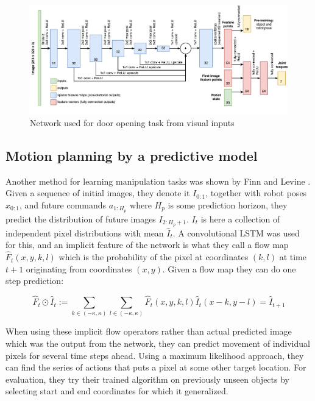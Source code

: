 \begin{figure}[h]
    \centering
    \includegraphics[width = 1.0\textwidth]{res/gps-net.pdf}
    \caption{Network used for door opening task from visual inputs \cite{chebotar2016path}}
    \label{fig:gps_net}
\end{figure}

\subsection{Motion planning by a predictive model}

Another method for learning manipulation tasks was shown by Finn and Levine
\cite{finn2016deep}. Given a sequence of initial images, they denote it
$I_{0:1}$, together with robot poses $x_{0:1}$, and future commands $a_{1:H_p}$
where $H_p$ is some prediction horizon, they predict the distribution of future
images $I_{2:H_p + 1}$. $I_t$ is here a collection of independent pixel
distributions with mean $\hat{I}_t$. A convolutional LSTM was used for this,
and an implicit feature of the network is what they call a flow map
$\hat{F}_t(x, y, k, l)$ which is the probability of the pixel at coordinates
$(k, l)$ at time $t+1$ originating from coordinates $(x, y)$. Given a flow map
they can do one step prediction:

\begin{equation}
    \hat{F}_t \odot \hat{I}_t := \sum_{k \in (-\kappa, \kappa)} \sum_{l \in (-\kappa, \kappa)} \hat{F}_t(x,y,k,l)\hat{I}_t(x-k, y-l) = \hat{I}_{t+1}
\end{equation}

When using these implicit flow operators rather than actual predicted image
which was the output from the network, they can predict movement of individual
pixels for several time steps ahead. Using a maximum likelihood approach, they
can find the series of actions that puts a pixel at some other target location.
For evaluation, they try their trained algorithm on previously unseen objects
by selecting start and end coordinates for which it generalized.

